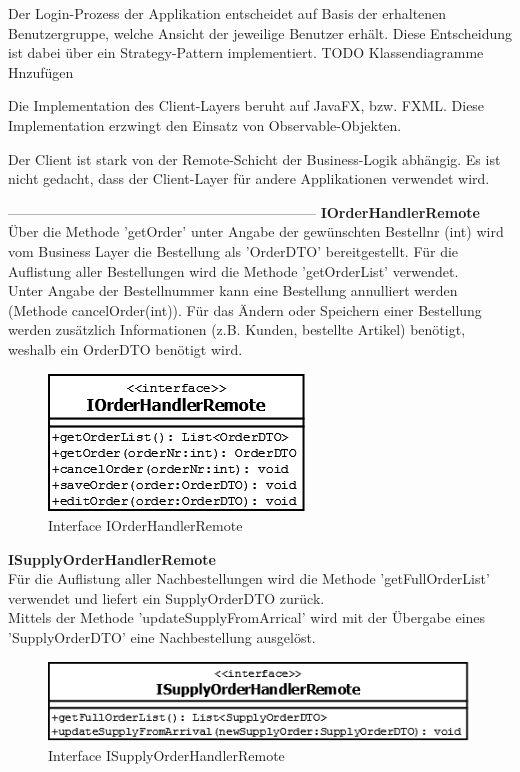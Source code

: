 Der Login-Prozess der Applikation entscheidet auf Basis der erhaltenen Benutzergruppe, welche Ansicht der jeweilige Benutzer erhält. Diese Entscheidung ist dabei über ein Strategy-Pattern implementiert. 
TODO Klassendiagramme Hnzufügen

Die Implementation des Client-Layers beruht auf JavaFX, bzw. FXML. Diese Implementation erzwingt den Einsatz von Observable-Objekten.

Der Client ist stark von der Remote-Schicht der Business-Logik abhängig. Es ist nicht gedacht, dass der Client-Layer für andere Applikationen verwendet wird.
\newline

------------------------------------------------------------------
\textbf{IOrderHandlerRemote}\\
Über die Methode 'getOrder' unter Angabe der gewünschten Bestellnr (int) wird vom Business Layer die Bestellung als 'OrderDTO' bereitgestellt. Für die Auflistung aller Bestellungen wird die Methode 'getOrderList' verwendet.\\
Unter Angabe der Bestellnummer kann eine Bestellung annulliert werden (Methode cancelOrder(int)). Für das Ändern oder Speichern einer Bestellung werden zusätzlich Informationen (z.B. Kunden, bestellte Artikel) benötigt, weshalb ein OrderDTO benötigt wird.


\begin{figure}[H]
	\includegraphics[width=0.3\linewidth]{Images/IOrderHandlerRemonte}
	\caption{Interface IOrderHandlerRemote}
	\label{fig:if-IOrderHandlerRemote}
\end{figure}

\textbf{ISupplyOrderHandlerRemote}\\
Für die Auflistung aller Nachbestellungen wird die Methode 'getFullOrderList' verwendet und liefert ein SupplyOrderDTO zurück.\\
Mittels der Methode 'updateSupplyFromArrical' wird mit der Übergabe eines 'SupplyOrderDTO' eine Nachbestellung ausgelöst. 
\begin{figure}[H]
	\includegraphics[width=0.6\linewidth]{Images/ISupplyOrderHandlerRemonte}
	\caption{Interface ISupplyOrderHandlerRemote}
	\label{fig:if-ISupplyOrderHandlerRemote}
\end{figure}


